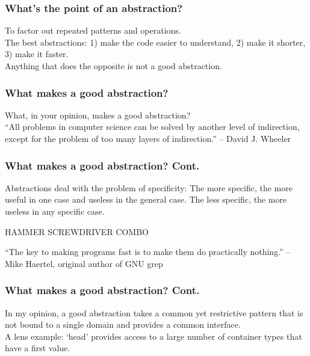 \documentclass{beamer}
\begin{document}
\begin{frame}
\frametitle{What's the point of an abstraction?}
  To factor out repeated patterns and operations. \\
  The best abstractions: 1) make the code easier to understand, 2) make it shorter, 3) make it faster. \\
  Anything that does the opposite is not a good abstraction. 
\end{frame}


\begin{frame}
\frametitle{What makes a good abstraction?}
What, in your opinion, makes a good abstraction? \\

``All problems in computer science can be solved by another level of indirection, except for the problem of too many layers of indirection.'' – David J. Wheeler
\end{frame}


\begin{frame}
\frametitle{What makes a good abstraction? Cont.}


  Abstractions deal with the problem of specificity: The more specific, the more useful in one case and useless in the general case. The less specific, the more useless in any specific case.

  HAMMER SCREWDRIVER COMBO

  ``The key to making programs fast is to make them do practically nothing.'' -- Mike Haertel, original author of GNU grep
\end{frame}


\begin{frame}
\frametitle{What makes a good abstraction? Cont.}
  In my opinion, a good abstraction takes a common yet restrictive pattern that is not bound to a single domain and provides a common interface. \\

  A lens example: `\textunderscore head' provides access to a large number of container types that have a first value. \\
\end{frame}
\end{document}
